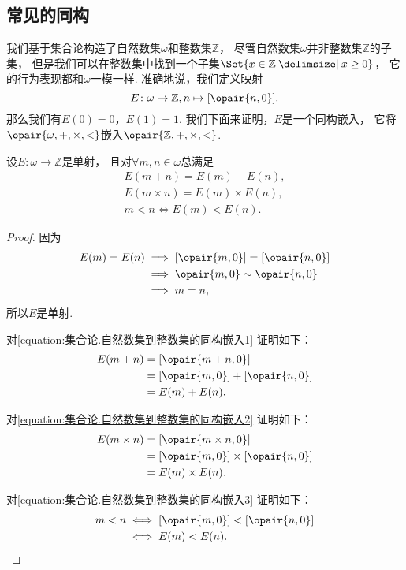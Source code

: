 \subsection{常见的同构}
我们基于集合论构造了自然数集\(\omega\)和整数集\(\mathbb{Z}\)，
尽管自然数集\(\omega\)并非整数集\(\mathbb{Z}\)的子集，
但是我们可以在整数集中找到一个子集\(\Set{ x \in \mathbb{Z} \given x \geq 0 }\)，
它的行为表现都和\(\omega\)一模一样.
准确地说，我们定义映射\[
	E\colon \omega\to\mathbb{Z}, n\mapsto[\opair{n,0}].
\]
那么我们有\(E(0)=0\)，\(E(1)=1\).
我们下面来证明，\(E\)是一个同构嵌入，
它将\(\opair{\omega,+,\times,<}\)嵌入\(\opair{\mathbb{Z},+,\times,<}\).
\begin{theorem}
设\(E\colon \omega\to\mathbb{Z}\)是单射，
且对\(\forall m,n\in\omega\)总满足
\begin{gather}
	E(m+n)=E(m)+E(n),
	\label{equation:集合论.自然数集到整数集的同构嵌入1} \\
	E(m \times n)=E(m) \times E(n),
	\label{equation:集合论.自然数集到整数集的同构嵌入2} \\
	m<n \iff E(m)<E(n).
	\label{equation:集合论.自然数集到整数集的同构嵌入3}
\end{gather}
\begin{proof}
因为\begin{align*}
	E(m)=E(n)
	&\implies
	[\opair{m,0}]=[\opair{n,0}] \\
	&\implies
	\opair{m,0}\sim\opair{n,0} \\
	&\implies
	m=n,
\end{align*}
所以\(E\)是单射.

对\cref{equation:集合论.自然数集到整数集的同构嵌入1} 证明如下：
\begin{align*}
	E(m+n)
	&= [\opair{m+n,0}] \\
	&= [\opair{m,0}]+[\opair{n,0}] \\
	&= E(m)+E(n).
\end{align*}

对\cref{equation:集合论.自然数集到整数集的同构嵌入2} 证明如下：
\begin{align*}
	E(m \times n)
	&= [\opair{m \times n,0}] \\
	&= [\opair{m,0}]\times[\opair{n,0}] \\
	&= E(m) \times E(n).
\end{align*}

对\cref{equation:集合论.自然数集到整数集的同构嵌入3} 证明如下：
\begin{align*}
	m<n
	&\iff
	[\opair{m,0}]<[\opair{n,0}] \\
	&\iff
	E(m)<E(n).
	\qedhere
\end{align*}
\end{proof}
\end{theorem}

